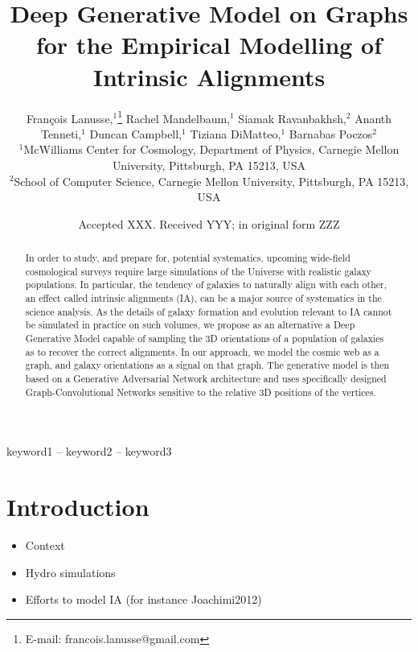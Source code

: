 \documentclass[a4paper,fleqn,usenatbib]{mnras}
\title[Generative model on graphs]{Deep Generative Model on Graphs for the Empirical Modelling of Intrinsic Alignments}
\author[F. Lanusse et al.]{
Fran\c{c}ois Lanusse,$^{1}$\thanks{E-mail: francois.lanusse@gmail.com}
Rachel Mandelbaum,$^{1}$
Siamak Ravanbakhsh,$^{2}$
Ananth Tenneti,$^{1}$
\newauthor
Duncan Campbell,$^{1}$
Tiziana DiMatteo,$^{1}$
Barnabas Poczos$^{2}$
\\
$^{1}$McWilliams Center for Cosmology, Department of Physics, Carnegie Mellon University, Pittsburgh, PA 15213, USA\\
$^{2}$School of Computer Science, Carnegie Mellon University, Pittsburgh, PA 15213, USA
}
\date{Accepted XXX. Received YYY; in original form ZZZ}
\begin{document}
\label{firstpage}
\pagerange{\pageref{firstpage}--\pageref{lastpage}}
\maketitle

\begin{abstract}
In order to study, and prepare for, potential systematics, upcoming wide-field cosmological surveys require large simulations of the
Universe with realistic galaxy populations. In particular, the tendency of galaxies to naturally align with each other, an effect called 
intrinsic alignments (IA), can be a major source of systematics in the science analysis. As the details of galaxy formation and evolution relevant
to IA cannot be simulated in practice on such volumes, we propose as an  alternative a Deep Generative Model capable of sampling 
the 3D orientations of a population of galaxies as to recover the correct alignments. In our approach, we model the cosmic 
web as a graph, and galaxy orientations as a signal on that graph. The generative model is then based on a Generative 
Adversarial Network architecture and uses specifically designed Graph-Convolutional Networks sensitive to the relative
3D positions of the vertices.
\end{abstract}

\begin{keywords}
keyword1 -- keyword2 -- keyword3
\end{keywords}



\section{Introduction}

\begin{itemize}
	\item Context
	\item Hydro simulations
	\item Efforts to model IA (for instance Joachimi2012)

\end{itemize}
\end{document}
